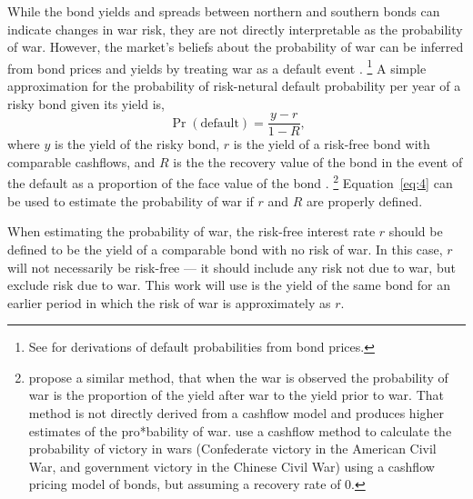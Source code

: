 \documentclass[11pt, oneside, article]{memoir}\usepackage[]{graphicx}\usepackage[]{color}
\begin{document}
While the bond yields and spreads between northern and southern bonds can indicate changes in war risk, they are not directly interpretable as the probability of war.
However, the market's beliefs about the probability of war can be inferred from bond prices and yields by treating war as a default event \parencite{HaberEtAl2012}.%
\footnote{See \textcites{Fons1987}{Merrick2001}{Chan-Lau2006} for derivations of default probabilities from bond prices.}
A simple approximation for the probability of risk-netural default probability per year of a risky bond given its yield is,
\begin{equation}
  \label{eq:4}
  \Pr(\text{default}) = \frac{y - r}{1 - R} \text{,}
\end{equation}
where $y$ is the yield of the risky bond, $r$ is the yield of a risk-free bond with comparable cashflows, and $R$ is the the recovery value of the bond in the event of the default as a proportion of the face value of the bond \parencite{HullPredescuWhite2004}.%
\footnote{\textcite[115]{WaldenstromFrey2008} propose a similar method, that when the war is observed the probability of war is the proportion of the yield after war to the yield prior to war.
  That method is not directly derived from a cashflow model and produces higher estimates of the pro*bability of war.
  \textcite{HaberEtAl2012} use a cashflow method to calculate the probability of victory in wars (Confederate victory in the American Civil War, and government victory in the Chinese Civil War) using a cashflow pricing model of bonds, but assuming a recovery rate of 0.
}
Equation~\eqref{eq:4} can be used to estimate the probability of war if $r$ and $R$ are properly defined.

When estimating the probability of war, the risk-free interest rate $r$ should be defined to be the yield of a comparable bond with no risk of war.
In this case, $r$ will not necessarily be risk-free --- it should include any risk not due to war, but exclude risk due to war.
This work will use is the yield of the same bond for an earlier period in which the risk of war is approximately as $r$.
\end{document}
